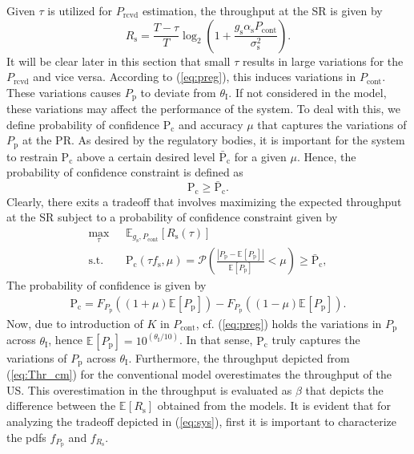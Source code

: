 \documentclass[conference, twocolumn]{IEEEtran}
\newcommand{\e}[2]{{\mathbb E}_{#1}\left[ #2 \right]}
\newcommand{\p}{\mathcal P}
\newcommand{\sub}[1]{_{\text{#1}}}
\newcommand{\pc}{\text{P}\sub{c}}
\newcommand{\pcd}{\bar{\text{P}}\sub{c}}
\newcommand{\preg}{P\sub{cont}}
\newcommand{\prcvd}{P\sub{rcvd}}
\newcommand{\pp}{P\sub{p}}
\newcommand{\ite}{\theta\sub{I}}
\newcommand{\rs}{R\sub{s}}
\newcommand{\ers}{\e{}{\rs}}
\newcommand{\gs}{g\sub{s}}
\newcommand{\as}{\alpha\sub{s}}
\newcommand{\nps}{\sigma^2\sub{s}}
\newcommand{\fsam}{f\sub{s}}
\newcommand{\fpp}{F_{\pp}}
\newcommand{\dpp}{f_{\pp}}
\newcommand{\dpreg}{f_{\preg}}
\newcommand{\drs}{f_{\rs}}
\DeclareMathOperator*{\maxi}{max}
\begin{document}
Given $\tau$ is utilized for $\prcvd$ estimation, the throughput at the SR is given by  
\begin{equation}
\rs = \frac{T - \tau}{T} \log_2 \left(1 + \frac{\gs \as \preg }{\nps} \right). 
\label{eq:Thr_pm}
\end{equation}
It will be clear later in this section that small $\tau$ results in large variations for the $\prcvd$ and vice versa. According to (\ref{eq:preg}), this induces variations in $\preg$. These variations causes $\pp$ to deviate from $\ite$. If not considered in the model, these variations may affect the performance of the system. To deal with this, we define probability of confidence $\pc$ and accuracy $\mu$ that captures the variations of $\pp$ at the PR. As desired by the regulatory bodies, it is important for the system to restrain $\pc$ above a certain desired level $\pcd$ for a given $\mu$. Hence, the probability of confidence constraint is defined as
\begin{equation}
\pc \ge \pcd.
\label{eq:pcc} 
\end{equation}
Clearly, there exits a tradeoff that involves maximizing the expected throughput at the SR subject to a probability of confidence constraint given by 
\begin{align}
\maxi_{\tau}  & \text{      } \e{\gs, \preg}{\rs(\tau)} 
 \label{eq:sys} \\
\text{s.t.} & \text{ } \pc(\tau \fsam, \mu) = \p \left( \frac{\left| \pp - \e{}{\pp} \right|}{\e{}{\pp}} < \mu \right) \ge \pcd, \nonumber  
\end{align}
The probability of confidence is given by 
\begin{align}
\pc = \fpp\left( {(1 + \mu) \e{}{\pp}}\right)  - \fpp\left({(1 - \mu) \e{}{\pp}} \right). \label{eq:pc} 
\end{align}
Now, due to introduction of $K$ in $\preg$, cf. (\ref{eq:preg}) holds the variations in $\pp$ across $\ite$, hence $\e{}{\pp} = 10^{\left( \ite/10 \right)}$. 
In that sense, $\pc$ truly captures the variations of $\pp$ across $\ite$.  
Furthermore, the throughput depicted from (\ref{eq:Thr_cm}) for the conventional model overestimates the throughput of the US. This overestimation in the throughput is evaluated as $\beta$ that depicts the difference between the $\ers$ obtained from the models. 
It is evident that for analyzing the tradeoff depicted in (\ref{eq:sys}), first it is important to characterize the pdfs $\dpp$ and $\drs$. %
\end{document}
